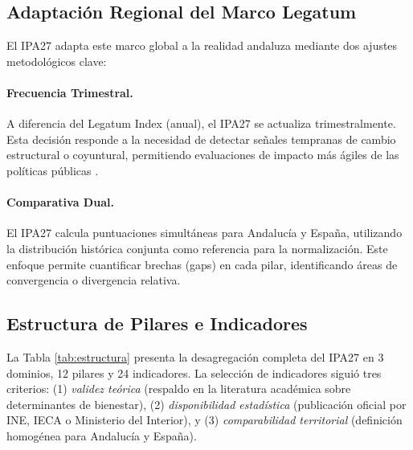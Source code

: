 \documentclass[authoryear,12pt]{elsarticle}
\begin{document}
\subsection{Adaptación Regional del Marco Legatum}

El IPA27 adapta este marco global a la realidad andaluza mediante dos ajustes metodológicos clave:

\paragraph{Frecuencia Trimestral.} A diferencia del Legatum Index (anual), el IPA27 se actualiza trimestralmente. Esta decisión responde a la necesidad de detectar señales tempranas de cambio estructural o coyuntural, permitiendo evaluaciones de impacto más ágiles de las políticas públicas \citep{banbura2013nowcasting}.

\paragraph{Comparativa Dual.} El IPA27 calcula puntuaciones simultáneas para Andalucía y España, utilizando la distribución histórica conjunta como referencia para la normalización. Este enfoque permite cuantificar brechas (gaps) en cada pilar, identificando áreas de convergencia o divergencia relativa.

\subsection{Estructura de Pilares e Indicadores}

La Tabla \ref{tab:estructura} presenta la desagregación completa del IPA27 en 3 dominios, 12 pilares y 24 indicadores. La selección de indicadores siguió tres criterios: (1) \textit{validez teórica} (respaldo en la literatura académica sobre determinantes de bienestar), (2) \textit{disponibilidad estadística} (publicación oficial por INE, IECA o Ministerio del Interior), y (3) \textit{comparabilidad territorial} (definición homogénea para Andalucía y España).
\end{document}

